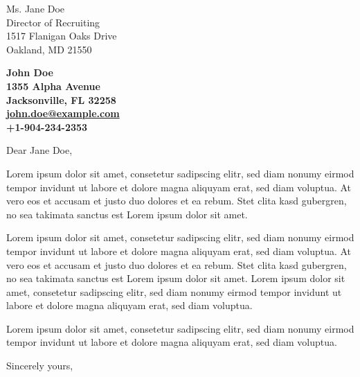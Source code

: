 \documentclass[11pt]{letter}
\begin{document}
\begin{letter}
{
  Ms. Jane Doe \\
  Director of Recruiting \\
  1517 Flanigan Oaks Drive \\
  Oakland, MD 21550
}
\begin{center}
  \large\bf
  {
    John Doe \\ 
    1355 Alpha Avenue \\ 
    Jacksonville, FL 32258 \\ 
    \href{mailto:john.doe@example.com}{john.doe@example.com} \\ 
    +1-904-234-2353
  }
\end{center}
\vfill
\opening{Dear Jane Doe,} 
  Lorem ipsum dolor sit amet, consetetur sadipscing elitr, sed diam nonumy eirmod 
  tempor invidunt ut labore et dolore magna aliquyam erat, sed diam voluptua. 
  At vero eos et accusam et justo duo dolores et ea rebum. Stet clita kasd gubergren, 
  no sea takimata sanctus est Lorem ipsum dolor sit amet. 

  Lorem ipsum dolor sit amet, consetetur sadipscing elitr, sed diam nonumy eirmod 
  tempor invidunt ut labore et dolore magna aliquyam erat, sed diam voluptua. 
  At vero eos et accusam et justo duo dolores et ea rebum. Stet clita kasd gubergren, 
  no sea takimata sanctus est Lorem ipsum dolor sit amet. Lorem ipsum dolor sit amet, 
  consetetur sadipscing elitr, sed diam nonumy eirmod tempor invidunt ut labore 
  et dolore magna aliquyam erat, sed diam voluptua.

	Lorem ipsum dolor sit amet, consetetur sadipscing elitr, 
  sed diam nonumy eirmod tempor invidunt ut labore 
  et dolore magna aliquyam erat, sed diam voluptua. 
\closing{Sincerely yours, \\
   \\
}
\end{letter}
\end{document}
